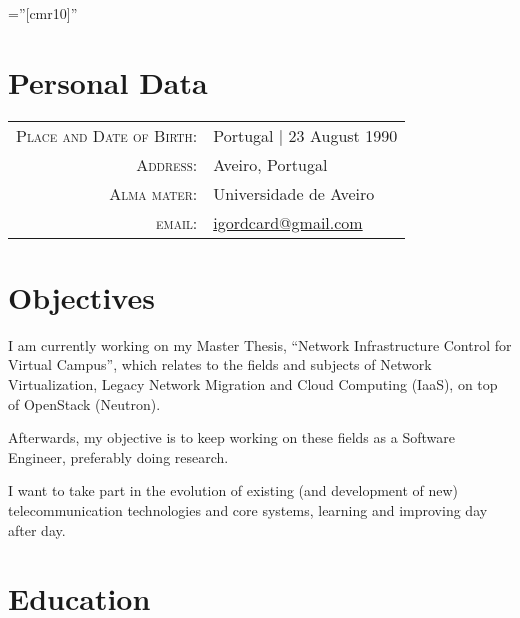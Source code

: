 \documentclass[a4paper,10pt]{article} %
\begin{document}
\pagestyle{empty} %

\font\fb=''[cmr10]'' %



\par{\bigskip\par} %

\section{Personal Data}

\begin{tabular}{rl}
\textsc{Place and Date of Birth:} & Portugal  | 23 August 1990 \\
\textsc{Address:} & Aveiro, Portugal \\
\textsc{Alma mater:} & Universidade de Aveiro\\
\textsc{email:} & \href{mailto:igordcard+cv@gmail.com}{igordcard@gmail.com}
\end{tabular}


\section{Objectives}

I am currently working on my Master Thesis, ``Network Infrastructure Control for Virtual Campus'', 
which relates to the fields and subjects of Network Virtualization, Legacy Network Migration and Cloud Computing (IaaS), 
on top of OpenStack (Neutron).

Afterwards, my objective is to keep working on these fields as a Software Engineer, preferably doing research.

I want to take part in the evolution of existing (and development of new) telecommunication technologies 
and core systems, learning and improving day after day.



\section{Education}
\end{document}
